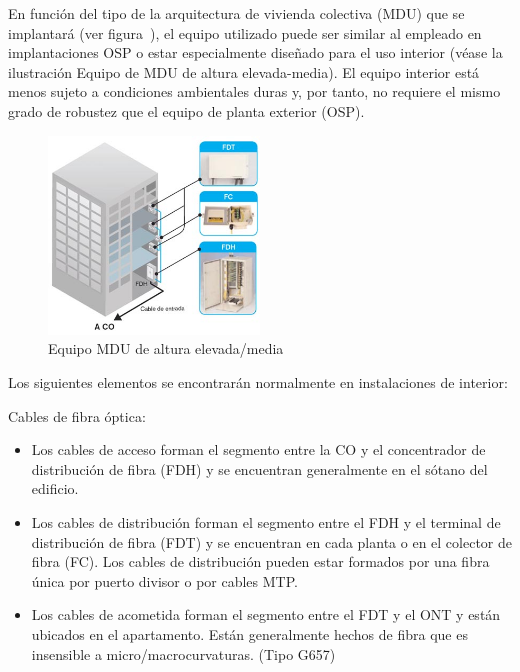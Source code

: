 En función del tipo de la arquitectura de vivienda colectiva (MDU) que se implantará (ver figura~), el equipo utilizado puede ser similar al empleado en implantaciones OSP o estar especialmente diseñado para el uso interior (véase la ilustración Equipo de MDU de altura elevada-media). El equipo interior está menos sujeto a condiciones ambientales duras y, por tanto, no requiere el mismo grado de robustez que el equipo de planta exterior (OSP).


\begin{figure}
  \begin{center}
   	\includegraphics[width=0.5\textwidth]{./img/punto7/Equipo-de-MDU-de-altura-elevada-media.jpg}	
   	\caption{Equipo MDU de altura elevada/media}
	\label{fig:MDU_Equipment}
  \end{center}  
\end{figure}




Los siguientes elementos se encontrarán normalmente en instalaciones de interior:

Cables de fibra óptica:

\begin{itemize}
\item Los cables de acceso forman el segmento entre la CO y el concentrador de distribución de fibra (FDH) y se encuentran generalmente en el sótano del edificio.
\item Los cables de distribución forman el segmento entre el FDH y el terminal de distribución de fibra (FDT) y se encuentran en cada planta o en el colector de fibra (FC). Los cables de distribución pueden estar formados por una fibra única por puerto divisor o por cables MTP.

\item Los cables de acometida forman el segmento entre el FDT y el ONT y están ubicados en el apartamento. Están generalmente hechos de fibra que es insensible a micro/macrocurvaturas. (Tipo G657)

\end{itemize}

